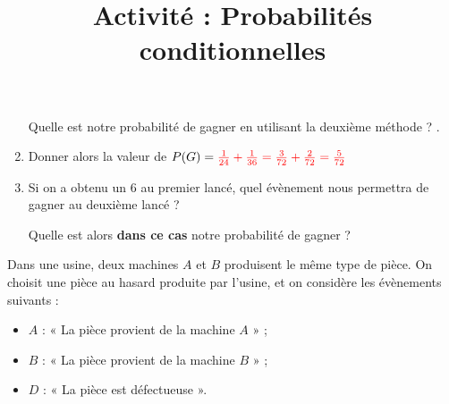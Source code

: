 \documentclass[
	classe=$1^eSTI2D$,
	headerTitle={Probabilités},
	landscape,twocolumn,noheader
]{exercice}
\begin{document}
\begin{enumerate}
	      Quelle est notre probabilité de gagner en utilisant la deuxième méthode ? .
	\item Donner alors la valeur de $P(G) = \correctionDots{\frac{1}{24} + \frac{1}{36} = \frac{3}{72} + \frac{2}{72} = \frac{5}{72}}$
	\item  Si on a obtenu un $6$ au premier lancé, quel évènement nous permettra de gagner au deuxième lancé ? 

	      Quelle est alors \textbf{dans ce cas} notre probabilité de gagner ? 
\end{enumerate}

\newpage

\title{Activité : Probabilités conditionnelles}

\maketitle

Dans une usine, deux machines $A$ et $B$ produisent le même type de pièce. On choisit une pièce au hasard produite par l'usine, et on considère les évènements suivants :

\begin{itemize}
	\item $A$ : « La pièce provient de la machine $A$ » ;
	\item $B$ : « La pièce provient de la machine $B$ » ;
	\item $D$ : « La pièce est défectueuse ».
\end{itemize}
\end{document}
